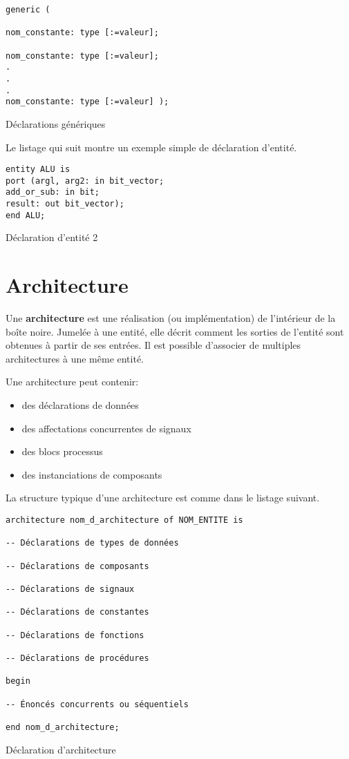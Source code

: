 \documentclass[letter, oneside]{book}
\begin{document}
\begin{listing}[htbp]
\begin{verbatim}
generic (

nom_constante: type [:=valeur];

nom_constante: type [:=valeur];
.
.
.
nom_constante: type [:=valeur] );
\end{verbatim}
\caption{Déclarations génériques}
\end{listing}


Le listage qui suit montre un exemple simple de déclaration d'entité. 

\begin{listing}[htbp]
\begin{verbatim}
entity ALU is
port (argl, arg2: in bit_vector;
add_or_sub: in bit;
result: out bit_vector);
end ALU;
\end{verbatim}
\caption{Déclaration d'entité 2}
\end{listing}

\section{Architecture}
\label{sec:orgb56cf2c}

Une \textbf{architecture} est une réalisation (ou implémentation) de
l'intérieur de la boîte noire. Jumelée à une entité, elle décrit
comment les sorties de l'entité sont obtenues à partir de ses
entrées. Il est possible d'associer de multiples architectures à une
même entité.

Une architecture peut contenir:

\begin{itemize}
\item des déclarations de données

\item des affectations concurrentes de signaux

\item des blocs processus

\item des instanciations de composants
\end{itemize}

La structure typique d'une architecture est comme dans le listage suivant.

\begin{listing}[htbp]
\begin{verbatim}
architecture nom_d_architecture of NOM_ENTITE is

-- Déclarations de types de données

-- Déclarations de composants

-- Déclarations de signaux

-- Déclarations de constantes

-- Déclarations de fonctions

-- Déclarations de procédures

begin

-- Énoncés concurrents ou séquentiels

end nom_d_architecture;
\end{verbatim}
\caption{Déclaration d'architecture}
\end{listing}
\end{document}
